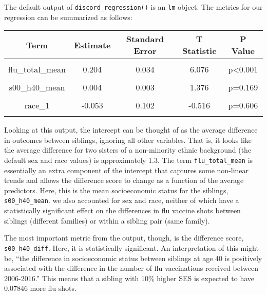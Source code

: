 \documentclass[10pt,a4paper,onecolumn]{article}
\begin{document}
The default output of \texttt{discord\_regression()} is an \texttt{lm}
object. The metrics for our regression can be summarized as follows:

\begin{table}[!h]
\centering
\begin{tabular}[t]{ccccc}
\toprule
Term & Estimate & Standard Error & T Statistic & P Value\\
\midrule
\cellcolor{gray!6}{(Intercept)} & \cellcolor{gray!6}{1.326} & \cellcolor{gray!6}{0.191} & \cellcolor{gray!6}{6.940} & \cellcolor{gray!6}{p<0.001}\\
flu\_total\_mean & 0.204 & 0.034 & 6.076 & p<0.001\\
\cellcolor{gray!6}{s00\_h40\_diff} & \cellcolor{gray!6}{0.008} & \cellcolor{gray!6}{0.002} & \cellcolor{gray!6}{3.927} & \cellcolor{gray!6}{p<0.001}\\
s00\_h40\_mean & 0.004 & 0.003 & 1.376 & p=0.169\\
\cellcolor{gray!6}{sex\_1} & \cellcolor{gray!6}{-0.135} & \cellcolor{gray!6}{0.097} & \cellcolor{gray!6}{-1.388} & \cellcolor{gray!6}{p=0.165}\\
\addlinespace
race\_1 & -0.053 & 0.102 & -0.516 & p=0.606\\
\cellcolor{gray!6}{sex\_2} & \cellcolor{gray!6}{0.057} & \cellcolor{gray!6}{0.097} & \cellcolor{gray!6}{0.590} & \cellcolor{gray!6}{p=0.555}\\
\bottomrule
\end{tabular}
\end{table}

Looking at this output, the intercept can be thought of as the average
difference in outcomes between siblings, ignoring all other variables.
That is, it looks like the average difference for two sisters of a
non-minority ethnic background (the default sex and race values) is
approximately 1.3. The term \texttt{flu\_total\_mean} is essentially an
extra component of the intercept that captures some non-linear trends
and allows the difference score to change as a function of the average
predictors. Here, this is the mean socioeconomic status for the
siblings, \texttt{s00\_h40\_mean}. we also accounted for sex and race,
neither of which have a statistically significant effect on the
differences in flu vaccine shots between siblings (different families)
or within a sibling pair (same family).

The most important metric from the output, though, is the difference
score, \texttt{s00\_h40\_diff}. Here, it is statistically significant.
An interpretation of this might be, ``the difference in socioeconomic
status between siblings at age 40 is positively associated with the
difference in the number of flu vaccinations received between
2006-2016.'' This means that a sibling with 10\% higher SES is expected
to have 0.07846 more flu shots.
\end{document}
